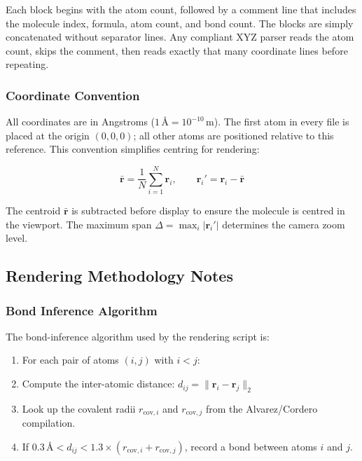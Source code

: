 \documentclass[11pt,a4paper]{article}
\begin{document}
\noindent Each block begins with the atom count, followed by a comment
line that includes the molecule index, formula, atom count, and bond
count.  The blocks are simply concatenated without separator lines.
Any compliant XYZ parser reads the atom count, skips the comment, then
reads exactly that many coordinate lines before repeating.

\subsubsection{Coordinate Convention}

All coordinates are in Angstroms ($1\,\text{\AA} = 10^{-10}\,\text{m}$).
The first atom in every file is placed at the origin $(0, 0, 0)$; all
other atoms are positioned relative to this reference.  This convention
simplifies centring for rendering:

\begin{equation}
  \bar{\mathbf{r}} = \frac{1}{N} \sum_{i=1}^{N} \mathbf{r}_i, \qquad
  \mathbf{r}_i' = \mathbf{r}_i - \bar{\mathbf{r}}
\end{equation}

The centroid $\bar{\mathbf{r}}$ is subtracted before display to ensure
the molecule is centred in the viewport.  The maximum span
$\Delta = \max_i |\mathbf{r}_i'|$ determines the camera zoom level.

\subsection{Rendering Methodology Notes}

\subsubsection{Bond Inference Algorithm}

The bond-inference algorithm used by the rendering script is:

\begin{enumerate}
  \item For each pair of atoms $(i, j)$ with $i < j$:
  \item Compute the inter-atomic distance:
        $d_{ij} = \|\mathbf{r}_i - \mathbf{r}_j\|_2$
  \item Look up the covalent radii $r_{\text{cov},i}$ and $r_{\text{cov},j}$
        from the Alvarez/Cordero compilation.
  \item If $0.3\,\text{\AA} < d_{ij} < 1.3 \times (r_{\text{cov},i} + r_{\text{cov},j})$,
        record a bond between atoms $i$ and $j$.
\end{enumerate}
\end{document}
